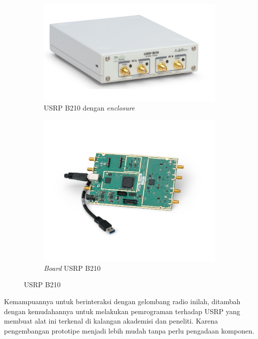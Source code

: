 \begin{center}
	\begin{figure}[h!]
		\begin{subfigure}[b]{0.5\linewidth}
			\includegraphics[width=\linewidth]{pics/bab2/B210.jpg}
			\caption{USRP B210 dengan \textit{enclosure}}
		\end{subfigure}
		\begin{subfigure}[b]{0.5\linewidth}
			\includegraphics[width=\linewidth]{pics/bab2/B210Board.jpg}
			\caption{\textit{Board} USRP B210}
		\end{subfigure}
		\caption{USRP B210}
		\label{pic:gambarusrp}
	\end{figure}
\end{center}


Kemampuannya untuk berinteraksi dengan gelombang radio inilah, ditambah dengan kemudahannya untuk melakukan pemrograman terhadap USRP yang membuat alat ini terkenal di kalangan akademisi dan peneliti. Karena pengembangan prototipe menjadi lebih mudah tanpa perlu pengadaan komponen.

